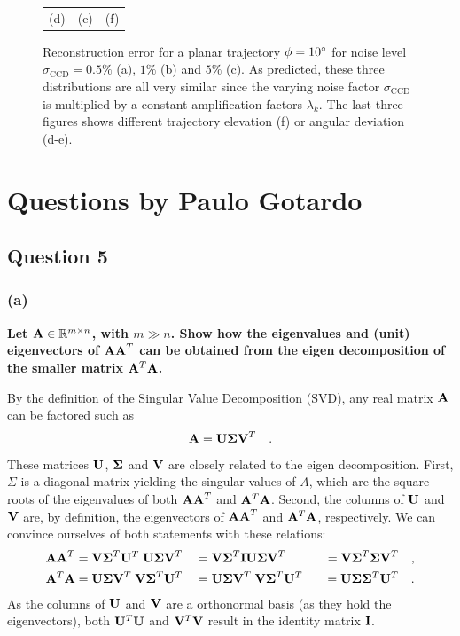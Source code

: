 \documentclass{report}
\begin{document}
\begin{figure}
\begin{tabular}{ccc}
  (d) &
  (e) &
  (f) 
  \end{tabular}
  \caption[Reconstruction error with $\phi = 10\degree$.]
   {Reconstruction error for a planar trajectory $\phi = 10\degree$ for noise level $\sigma_\text{CCD} = 0.5\%$ (a), $1\%$ (b) and $5\%$ (c). As predicted, these three distributions are all very similar since the varying noise factor $\sigma_\text{CCD}$ is multiplied by a constant amplification factors $\lambda_k$. The last three figures shows different trajectory elevation (f) or angular deviation (d-e).}
  \label{q4:recons_err}
\end{figure}

\chapter{Questions by Paulo Gotardo}

\section{Question 5}
\subsection{(a)}
\textbf{Let $\mathbf{A} \in \mathbb{R}^{m \times n}$, with $m \gg n$. Show how the eigenvalues and (unit) eigenvectors of $\mathbf{AA}^T$ can be obtained from the eigen decomposition of the smaller matrix $\mathbf{A}^T\mathbf{A}$.}

By the definition of the Singular Value Decomposition (SVD), any real matrix $\mathbf{A}$ can be factored such as
\begin{equation}
\mathbf{A} = \mathbf{U \Sigma V}^T \quad.
\end{equation}
These matrices $\mathbf{U}$, $\mathbf{\Sigma}$ and $\mathbf{V}$ are closely related to the eigen decomposition. First, $\Sigma$ is a diagonal matrix yielding the singular values of $A$, which are the square roots of the eigenvalues of both $\mathbf{AA}^T$ and $\mathbf{A}^T\mathbf{A}$. Second, the columns of $\mathbf{U}$ and $\mathbf{V}$ are, by definition, the eigenvectors of $\mathbf{AA}^T$ and $\mathbf{A}^T\mathbf{A}$, respectively. We can convince ourselves of both statements with these relations:
\begin{align*}
\mathbf{AA}^T           &= \mathbf{V\Sigma}^T\mathbf{U}^T \; \mathbf{U\Sigma V}^T
                        &&= \mathbf{V\Sigma}^T\mathbf{IU\Sigma V}^T 
                        &&&= \mathbf{V\Sigma}^T\mathbf{\Sigma V}^T \quad,\\
\mathbf{A}^T\mathbf{A}  &= \mathbf{U\Sigma V}^T \; \mathbf{V\Sigma}^T\mathbf{U}^T
                        &&= \mathbf{U\Sigma V}^T \; \mathbf{V\Sigma}^T\mathbf{U}^T
                        &&&= \mathbf{U\Sigma}\mathbf{\Sigma}^T\mathbf{U}^T \quad.
\end{align*}
As the columns of $\mathbf{U}$ and $\mathbf{V}$ are a orthonormal basis (as they hold the eigenvectors), both $\mathbf{U}^T\mathbf{U}$ and $\mathbf{V}^T\mathbf{V}$ result in the identity matrix $\mathbf{I}$.
\end{document}
